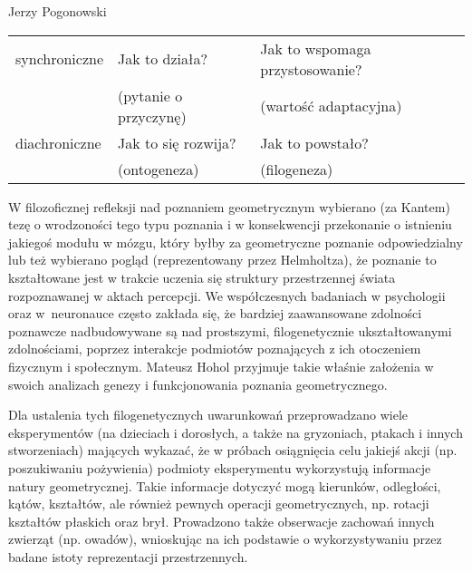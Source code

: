 \begin{newrevengenv}{Jerzy Pogonowski}
\begin{center}
\begin{small}
\begin{tabular}{|l|l|l|}
\hline

synchroniczne & Jak to działa? & Jak to wspomaga przystosowanie?\\

 & (pytanie o przyczynę) & (wartość adaptacyjna)\\

\hline

diachroniczne & Jak to się rozwija? & Jak to powstało?\\

 & (ontogeneza) & (filogeneza)\\

\hline

\end{tabular}
\end{small}
\end{center}
\medskip

W filozoficznej refleksji nad poznaniem geometrycznym wybierano
(za Kantem) tezę o wrodzoności tego typu poznania i w konsekwencji
przekonanie o istnieniu jakiegoś modułu w mózgu, który byłby za
geometryczne poznanie odpowiedzialny lub też wybierano pogląd
(reprezentowany przez Helmholtza), że poznanie to kształtowane
jest w trakcie uczenia się struktury przestrzennej świata
rozpoznawanej w aktach percepcji. We współczesnych badaniach w
psychologii oraz w~neuronauce często zakłada się, że bardziej
zaawansowane zdolności poznawcze nadbudowywane są nad prostszymi,
filogenetycznie ukształtowanymi zdolnościami, poprzez interakcje
podmiotów poznających z ich otoczeniem fizycznym i społecznym.
Mateusz Hohol przyjmuje takie właśnie założenia w swoich analizach
genezy i funkcjonowania poznania geometrycznego.

Dla ustalenia tych filogenetycznych uwarunkowań przeprowa\-dzano
wiele eksperymentów (na dzieciach i dorosłych, a także na
gryzoniach, ptakach i innych stworzeniach) mających wykazać, że w
próbach osiągnięcia celu jakiejś akcji (np. poszukiwaniu
pożywienia) podmioty eksperymentu wykorzystują informacje natury
geometrycznej. Takie informacje dotyczyć mogą kierunków,
odległości, kątów, kształtów, ale również pewnych operacji
geometrycznych, np. rotacji kształtów płaskich oraz brył.
Prowadzono także obserwacje zachowań innych zwierząt (np. owadów),
wnioskując na ich podstawie o wykorzystywaniu przez badane istoty
reprezentacji przestrzennych.


\end{newrevengenv}
